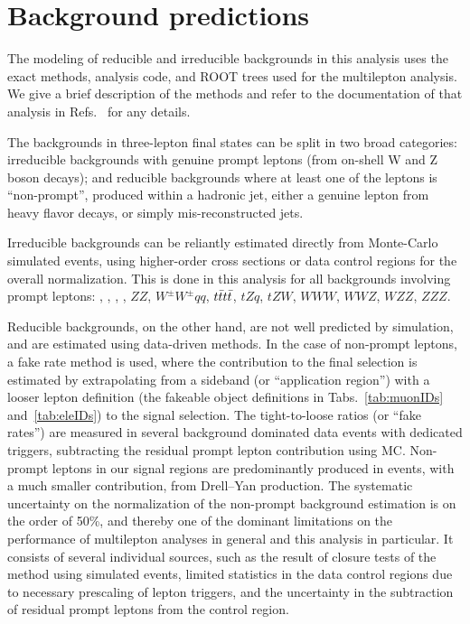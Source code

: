 \section{Background predictions}
\label{secc:bg}

The modeling of reducible and irreducible backgrounds in this analysis uses the exact methods, analysis code, and ROOT trees used for the \ttH multilepton analysis. We give a brief description of the methods and refer to the documentation of that analysis in Refs.~\cite{CMS_AN_2016-211,CMS_AN_2017-029} for any details.

The backgrounds in three-lepton final states can be split in two broad categories: irreducible backgrounds with genuine prompt leptons (\ie from on-shell W and Z boson decays); and reducible backgrounds where at least one of the leptons is ``non-prompt'', \ie produced within a hadronic jet, either a genuine lepton from heavy flavor decays, or simply mis-reconstructed jets. %

Irreducible backgrounds can be reliantly estimated directly from Monte-Carlo simulated events, using higher-order cross sections or data control regions for the overall normalization. This is done in this analysis for all backgrounds involving prompt leptons: \ttW, \ttZ, \ttH, \WZ, $ZZ$, $W^\pm W^\pm qq$, $t\bar{t}t\bar{t}$, $tZq$, $tZW$, $WWW$, $WWZ$, $WZZ$, $ZZZ$.

Reducible backgrounds, on the other hand, are not well predicted by simulation, and are estimated using data-driven methods. In the case of non-prompt leptons, a fake rate method is used, where the contribution to the final selection is estimated by extrapolating from a sideband (or ``application region'') with a looser lepton definition (the fakeable object definitions in Tabs.~\ref{tab:muonIDs} and~\ref{tab:eleIDs}) to the signal selection. The tight-to-loose ratios (or ``fake rates'') are measured in several background dominated data events with dedicated triggers, subtracting the residual prompt lepton contribution using MC. Non-prompt leptons in our signal regions are predominantly produced in \ttbar events, with a much smaller contribution, from Drell--Yan production. The systematic uncertainty on the normalization of the non-prompt background estimation is on the order of 50\%, and thereby one of the dominant limitations on the performance of multilepton analyses in general and this analysis in particular. It consists of several individual sources, such as the result of closure tests of the method using simulated events, limited statistics in the data control regions due to necessary prescaling of lepton triggers, and the uncertainty in the subtraction of residual prompt leptons from the control region.

